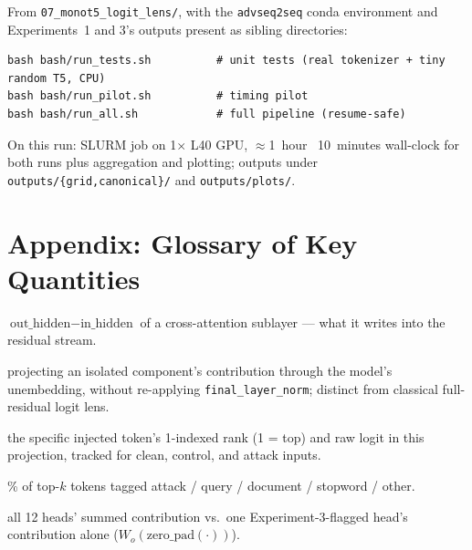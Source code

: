 \documentclass[11pt]{article}
\begin{document}
From \texttt{07\_monot5\_logit\_lens/}, with the \texttt{advseq2seq} conda
environment and Experiments~1 and 3's outputs present as sibling
directories:

\begin{lstlisting}
bash bash/run_tests.sh          # unit tests (real tokenizer + tiny random T5, CPU)
bash bash/run_pilot.sh          # timing pilot
bash bash/run_all.sh            # full pipeline (resume-safe)
\end{lstlisting}

\noindent On this run: SLURM job on 1$\times$ L40 GPU, $\approx$1~hour~
10~minutes wall-clock for both runs plus aggregation and plotting; outputs
under \texttt{outputs/\{grid,canonical\}/} and \texttt{outputs/plots/}.

\section*{Appendix: Glossary of Key Quantities}

\begin{description}[leftmargin=1.6em,style=nextline]
  \item[contribution] $\text{out\_hidden} - \text{in\_hidden}$ of a
  cross-attention sublayer — what it writes into the residual stream.
  \item[direct logit attribution] projecting an isolated component's
  contribution through the model's unembedding, without re-applying
  \texttt{final\_layer\_norm}; distinct from classical full-residual logit
  lens.
  \item[attack\_token\_rank / logit] the specific injected token's
  1-indexed rank (1 = top) and raw logit in this projection, tracked for
  clean, control, and attack inputs.
  \item[bucket composition] \% of top-$k$ tokens tagged attack / query /
  document / stopword / other.
  \item[whole-block / per-head] all 12 heads' summed contribution vs.\ one
  Experiment-3-flagged head's contribution alone ($W_o(\text{zero\_pad}
  (\cdot))$).
\end{description}
\end{document}
